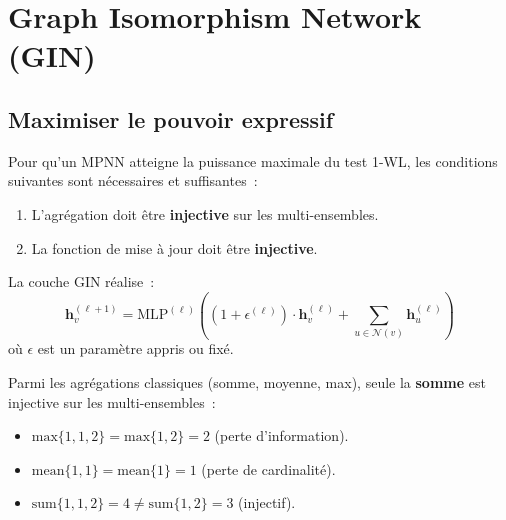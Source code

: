 \section{Graph Isomorphism Network (GIN)}

\subsection{Maximiser le pouvoir expressif}

\begin{theoreme}[GIN --- Xu et al., 2019]
Pour qu'un MPNN atteigne la puissance maximale du test 1-WL, les conditions
suivantes sont n\'ecessaires et suffisantes~:
\begin{enumerate}
    \item L'agr\'egation doit \^etre \textbf{injective} sur les multi-ensembles.
    \item La fonction de mise \`a jour doit \^etre \textbf{injective}.
\end{enumerate}
\end{theoreme}

\begin{definition}
La couche GIN r\'ealise~:
\[
    \mathbf{h}_v^{(\ell+1)} = \text{MLP}^{(\ell)}\!\left((1 + \epsilon^{(\ell)})
    \cdot \mathbf{h}_v^{(\ell)} + \sum_{u \in \mathcal{N}(v)}
    \mathbf{h}_u^{(\ell)}\right)
\]
o\`u $\epsilon$ est un param\`etre appris ou fix\'e.
\end{definition}

\begin{proposition}
Parmi les agr\'egations classiques (somme, moyenne, max), seule la \textbf{somme}
est injective sur les multi-ensembles~:
\begin{itemize}
    \item $\text{max}\{1, 1, 2\} = \text{max}\{1, 2\} = 2$ (perte d'information).
    \item $\text{mean}\{1, 1\} = \text{mean}\{1\} = 1$ (perte de cardinalit\'e).
    \item $\text{sum}\{1, 1, 2\} = 4 \neq \text{sum}\{1, 2\} = 3$ (injectif).
\end{itemize}
\end{proposition}

